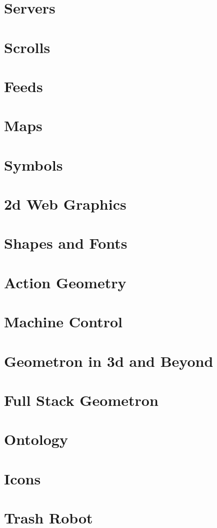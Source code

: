 \documentclass[ebook,12pt,openany]{memoir} %
\begin{document}
\chapter{Servers}

\chapter{Scrolls}

\chapter{Feeds}

\chapter{Maps}

\chapter{Symbols}

\chapter{2d Web Graphics}

\chapter{Shapes and Fonts}

\chapter{Action Geometry}

\chapter{Machine Control}

\chapter{Geometron in 3d and Beyond}

\chapter{Full Stack Geometron}

\chapter{Ontology}

\chapter{Icons}

\chapter{Trash Robot}



\end{document}
